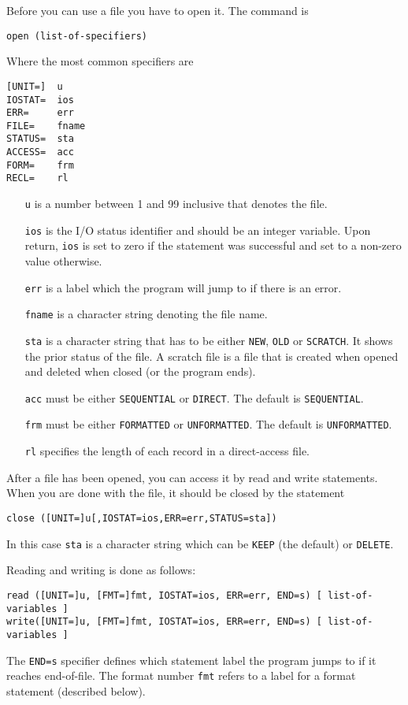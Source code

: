 Before you can use a file you have to open it. The command is 
\begin{lstlisting}[language={[77]fortran}, style=snippet]
      open (list-of-specifiers)
\end{lstlisting}
Where the most common specifiers are
\begin{lstlisting}
[UNIT=]  u
IOSTAT=  ios
ERR=     err
FILE=    fname
STATUS=  sta
ACCESS=  acc
FORM=    frm
RECL=    rl
\end{lstlisting}
\begin{itemize}
\item[\texttt{u}]  is a number between 1 and 99 inclusive that denotes the file.
\item[\texttt{ios}] is the I/O status identifier and should be an integer variable. Upon return, \texttt{ios} is set to zero if the statement was successful and set to a non-zero value otherwise. 
\item[\texttt{err}] is a label which the program will jump to if there is an error. 
\item[\texttt{fname}] is a character string denoting the file name. 
\item[\texttt{sta}] is a character string that has to be either \texttt{NEW}, \texttt{OLD} or \texttt{SCRATCH}. It shows the prior status of the file. A scratch file is a file that is created when opened and deleted when closed (or the program ends). 
\item[\texttt{acc}] must be either \texttt{SEQUENTIAL} or \texttt{DIRECT}. The default is \texttt{SEQUENTIAL}.
\item[\texttt{frm}] must be either \texttt{FORMATTED} or \texttt{UNFORMATTED}. The default is \texttt{UNFORMATTED}. 
\item[\texttt{rl}] specifies the length of each record in a direct-access file. 
\end{itemize}
After a file has been opened, you can access it by read and write statements. When you are done with the file, it should be closed by the statement 
\begin{lstlisting}[language={[77]fortran}, style=snippet]
      close ([UNIT=]u[,IOSTAT=ios,ERR=err,STATUS=sta])
\end{lstlisting}
In this case \texttt{sta} is a character string which can be \texttt{KEEP} (the default) or \texttt{DELETE}. 

Reading and writing is done as follows:
\begin{lstlisting}[language={[77]fortran}, style=snippet]
read ([UNIT=]u, [FMT=]fmt, IOSTAT=ios, ERR=err, END=s) [ list-of-variables ]
write([UNIT=]u, [FMT=]fmt, IOSTAT=ios, ERR=err, END=s) [ list-of-variables ]
\end{lstlisting}
The \texttt{END=s} specifier defines which statement label the program jumps to if it reaches end-of-file. The format number \texttt{fmt} refers to a label for a format statement (described below).

